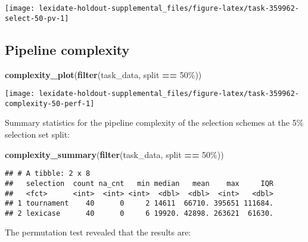 \documentclass[
]{book}
\newenvironment{Shaded}{\begin{snugshade}}{\end{snugshade}}
\newcommand{\FunctionTok}[1]{\textcolor[rgb]{0.13,0.29,0.53}{\textbf{#1}}}
\newcommand{\NormalTok}[1]{#1}
\newcommand{\SpecialCharTok}[1]{\textcolor[rgb]{0.81,0.36,0.00}{\textbf{#1}}}
\newcommand{\StringTok}[1]{\textcolor[rgb]{0.31,0.60,0.02}{#1}}
\begin{document}
\texttt{[image: lexidate-holdout-supplemental\_files/figure-latex/task-359962-select-50-pv-1]}

\hypertarget{pipeline-complexity-50}{%
\subsection{Pipeline complexity}\label{pipeline-complexity-50}}

\begin{Shaded}
\begin{Highlighting}[]
\FunctionTok{complexity\_plot}\NormalTok{(}\FunctionTok{filter}\NormalTok{(task\_data, split }\SpecialCharTok{==} \StringTok{\textquotesingle{}50\%\textquotesingle{}}\NormalTok{))}
\end{Highlighting}
\end{Shaded}

\texttt{[image: lexidate-holdout-supplemental\_files/figure-latex/task-359962-complexity-50-perf-1]}

Summary statistics for the pipeline complexity of the selection schemes at the 5\% selection set split:

\begin{Shaded}
\begin{Highlighting}[]
\FunctionTok{complexity\_summary}\NormalTok{(}\FunctionTok{filter}\NormalTok{(task\_data, split }\SpecialCharTok{==} \StringTok{\textquotesingle{}50\%\textquotesingle{}}\NormalTok{))}
\end{Highlighting}
\end{Shaded}

\begin{verbatim}
## # A tibble: 2 x 8
##   selection  count na_cnt   min median   mean    max     IQR
##   <fct>      <int>  <int> <int>  <dbl>  <dbl>  <int>   <dbl>
## 1 tournament    40      0     2 14611  66710. 395651 111684.
## 2 lexicase      40      0     6 19920. 42898. 263621  61630.
\end{verbatim}

The permutation test revealed that the results are:
\end{document}
